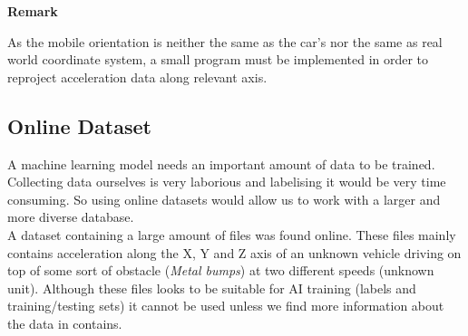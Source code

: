 \noindent
\begin{minipage}[!hc]{0.12\textwidth}
   \textbf{Remark}
\end{minipage}
\vrule\enskip\vrule\quad\begin{minipage}{\dimexpr 0.87\textwidth-0.8pt-1.5em}
As the mobile orientation is neither the same as the car's nor the same as real world coordinate system, a small program must be implemented in order to reproject acceleration data along relevant axis.
\end{minipage}

\subsection{Online Dataset}
A machine learning model needs an important amount of data to be trained. Collecting data ourselves is very laborious and labelising it would be very time consuming. So using online datasets would allow us to work with a larger and more diverse database.\\
A dataset containing a large amount of files was found online. These files mainly contains acceleration along the X, Y and Z axis of an unknown vehicle driving on top of some sort of obstacle (\textit{Metal bumps}) at two different speeds (unknown unit). Although these files looks to be suitable for AI training (labels and training/testing sets) it cannot be used unless we find more information about the data in contains.

